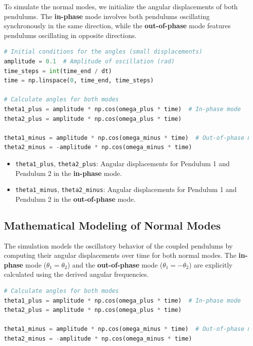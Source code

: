 \documentclass[12pt]{report} %
\begin{document}
To simulate the normal modes, we initialize the angular displacements of both pendulums. The \textbf{in-phase} mode involves both pendulums oscillating synchronously in the same direction, while the \textbf{out-of-phase} mode features pendulums oscillating in opposite directions.

\begin{lstlisting}[language=Python, caption={Initializing Angles for Normal Modes}, label={lst:initial_conditions_angles_task4}]
# Initial conditions for the angles (small displacements)
amplitude = 0.1  # Amplitude of oscillation (rad)
time_steps = int(time_end / dt)
time = np.linspace(0, time_end, time_steps)

# Calculate angles for both modes
theta1_plus = amplitude * np.cos(omega_plus * time)  # In-phase mode
theta2_plus = amplitude * np.cos(omega_plus * time)

theta1_minus = amplitude * np.cos(omega_minus * time)  # Out-of-phase mode
theta2_minus = -amplitude * np.cos(omega_minus * time)
\end{lstlisting}

\begin{itemize}
    \item \texttt{theta1\_plus}, \texttt{theta2\_plus}: Angular displacements for Pendulum 1 and Pendulum 2 in the \textbf{in-phase} mode.
    \item \texttt{theta1\_minus}, \texttt{theta2\_minus}: Angular displacements for Pendulum 1 and Pendulum 2 in the \textbf{out-of-phase} mode.
\end{itemize}

\subsection{Mathematical Modeling of Normal Modes}
\label{subsec:part1_task4_modeling}

The simulation models the oscillatory behavior of the coupled pendulums by computing their angular displacements over time for both normal modes. The \textbf{in-phase} mode (\( \theta_1 = \theta_2 \)) and the \textbf{out-of-phase} mode (\( \theta_1 = -\theta_2 \)) are explicitly calculated using the derived angular frequencies.

\begin{lstlisting}[language=Python, caption={Calculating Angular Displacements for Normal Modes}, label={lst:angular_displacements_task4}]
# Calculate angles for both modes
theta1_plus = amplitude * np.cos(omega_plus * time)  # In-phase mode
theta2_plus = amplitude * np.cos(omega_plus * time)

theta1_minus = amplitude * np.cos(omega_minus * time)  # Out-of-phase mode
theta2_minus = -amplitude * np.cos(omega_minus * time)
\end{lstlisting}
\end{document}
